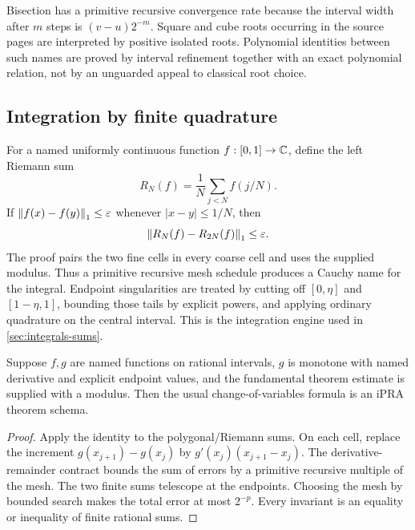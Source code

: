 Bisection has a primitive recursive convergence rate because the interval
width after \(m\) steps is \((v-u)2^{-m}\).  Square and cube roots occurring
in the source pages are interpreted by positive isolated roots.  Polynomial
identities between such names are proved by interval refinement together with
an exact polynomial relation, not by an unguarded appeal to classical root
choice.

\subsection{Integration by finite quadrature}

For a named uniformly continuous function \(f:[0,1]\to\mathbb C\), define the
left Riemann sum
\[
  R_N(f)=\frac1N\sum_{j<N}f(j/N).
\]
If \(\left\lVert f(x)-f(y)\right\rVert_1\le\varepsilon\) whenever
\(|x-y|\le1/N\), then
\[
  \left\lVert R_N(f)-R_{2N}(f)\right\rVert_1\le\varepsilon.
\]
The proof pairs the two fine cells in every coarse cell and uses the supplied
modulus.  Thus a primitive recursive mesh schedule produces a Cauchy name for
the integral.  Endpoint singularities are treated by cutting off
\([0,\eta]\) and \([1-\eta,1]\), bounding those tails by explicit powers,
and applying ordinary quadrature on the central interval.  This is the
integration engine used in \cref{sec:integrals-sums}.

\begin{lemma}\label{lem:finite-substitution}
Suppose \(f,g\) are named functions on rational intervals, \(g\) is
monotone with named derivative and explicit endpoint values, and the
fundamental theorem estimate is supplied with a modulus.  Then the usual
change-of-variables formula is an iPRA theorem schema.
\end{lemma}

\begin{proof}
Apply the identity to the polygonal/Riemann sums.  On each cell, replace the
increment \(g(x_{j+1})-g(x_j)\) by
\(g'(x_j)(x_{j+1}-x_j)\).  The derivative-remainder contract bounds the
sum of errors by a primitive recursive multiple of the mesh.  The two finite
sums telescope at the endpoints.  Choosing the mesh by bounded search makes
the total error at most \(2^{-p}\).  Every invariant is an equality or
inequality of finite rational sums.
\end{proof}
